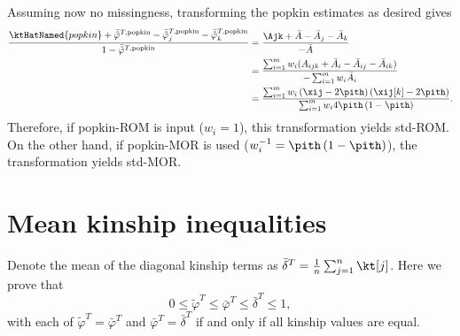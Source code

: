 \documentclass[11pt]{article}
\begin{document}
\begin{appendices}
  Assuming now no missingness, transforming the popkin estimates as desired gives
  \begin{align*}
    \frac{
    \ktHatNamed{popkin}
    + \bar{ \hat{ \varphi } }^{T,\text{popkin}}
    - \bar{ \hat{ \varphi } }_j^{T,\text{popkin}}
    - \bar{ \hat{ \varphi } }_k^{T,\text{popkin}}
    }{
    1 - \bar{ \hat{ \varphi } }^{T,\text{popkin}}
    }
    &=
      \frac{
      \Ajk
      + \bar{A}
      - \bar{A}_j
      - \bar{A}_k
      }{
      - \bar{A}
      }
    \\
    &=
      \frac{
      \sum_{i=1}^m w_i ( A_{ijk} + \bar{A}_i - \bar{A}_{ij} - \bar{A}_{ik} )
      }{
      - \sum_{i=1}^m w_i \bar{A}_i
      }
    \\
    &=
      \frac{
      \sum_{i=1}^m w_i \left( \xij - 2 \pith \right) \left( \xij[k] - 2 \pith \right)
      }{
      \sum_{i=1}^m w_i 4 \pith \left( 1 - \pith \right)
      }
      .
  \end{align*}
  Therefore, if popkin-ROM is input ($w_i=1$), this transformation yields std-ROM.
  On the other hand, if popkin-MOR is used ($w_i^{-1} = \pith \left( 1 - \pith \right)$), the transformation yields std-MOR.
  
  \section{Mean kinship inequalities}

  \label{sec:mean_kinship_ineqs}

  Denote the mean of the diagonal kinship terms as $\bar{\delta}^T = \frac{1}{n} \sum_{j=1}^n \kt[j]$.
  Here we prove that
  $$
  0 \le \tilde{\varphi}^T \le \bar{\varphi}^T \le \bar{\delta}^T \le 1,
  $$
  with each of $\tilde{\varphi}^T = \bar{\varphi}^T$ and $\bar{\varphi}^T = \bar{\delta}^T$ if and only if all kinship values are equal.


\end{appendices}
\end{document}

